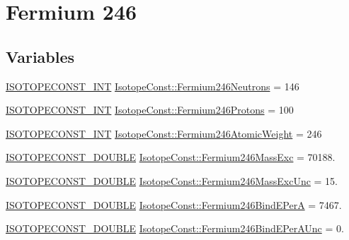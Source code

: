 \hypertarget{group___isotope_const-_fermium-_fm246}{}\section{Fermium 246}
\label{group___isotope_const-_fermium-_fm246}
\subsection*{Variables}
\begin{DoxyCompactItemize}
\item 
\mbox{\hyperlink{group___isotope_const-_macros_ga5f18360b3e99483a35c32d789e62621c}{I\+S\+O\+T\+O\+P\+E\+C\+O\+N\+S\+T\+\_\+\+I\+NT}} \mbox{\hyperlink{group___isotope_const-_fermium-_fm246_gab52c58f403af0334c850b33e5f3396a6}{Isotope\+Const\+::\+Fermium246\+Neutrons}} = 146
\item 
\mbox{\hyperlink{group___isotope_const-_macros_ga5f18360b3e99483a35c32d789e62621c}{I\+S\+O\+T\+O\+P\+E\+C\+O\+N\+S\+T\+\_\+\+I\+NT}} \mbox{\hyperlink{group___isotope_const-_fermium-_fm246_ga816e32ad23fcf279f650217ee8f920bb}{Isotope\+Const\+::\+Fermium246\+Protons}} = 100
\item 
\mbox{\hyperlink{group___isotope_const-_macros_ga5f18360b3e99483a35c32d789e62621c}{I\+S\+O\+T\+O\+P\+E\+C\+O\+N\+S\+T\+\_\+\+I\+NT}} \mbox{\hyperlink{group___isotope_const-_fermium-_fm246_ga1413e9da0cdba99f48173dc3727a7705}{Isotope\+Const\+::\+Fermium246\+Atomic\+Weight}} = 246
\item 
\mbox{\hyperlink{group___isotope_const-_macros_ga8f45a7272ce02c0b4c65c44636ed719a}{I\+S\+O\+T\+O\+P\+E\+C\+O\+N\+S\+T\+\_\+\+D\+O\+U\+B\+LE}} \mbox{\hyperlink{group___isotope_const-_fermium-_fm246_gaa5d056477860106f12aacad3d988c402}{Isotope\+Const\+::\+Fermium246\+Mass\+Exc}} = 70188.
\item 
\mbox{\hyperlink{group___isotope_const-_macros_ga8f45a7272ce02c0b4c65c44636ed719a}{I\+S\+O\+T\+O\+P\+E\+C\+O\+N\+S\+T\+\_\+\+D\+O\+U\+B\+LE}} \mbox{\hyperlink{group___isotope_const-_fermium-_fm246_ga9bc4e0f5dca55a0f1b1cc10fb8389759}{Isotope\+Const\+::\+Fermium246\+Mass\+Exc\+Unc}} = 15.
\item 
\mbox{\hyperlink{group___isotope_const-_macros_ga8f45a7272ce02c0b4c65c44636ed719a}{I\+S\+O\+T\+O\+P\+E\+C\+O\+N\+S\+T\+\_\+\+D\+O\+U\+B\+LE}} \mbox{\hyperlink{group___isotope_const-_fermium-_fm246_gaa6097c8b698c10487239653dcbab34ca}{Isotope\+Const\+::\+Fermium246\+Bind\+E\+PerA}} = 7467.
\item 
\mbox{\hyperlink{group___isotope_const-_macros_ga8f45a7272ce02c0b4c65c44636ed719a}{I\+S\+O\+T\+O\+P\+E\+C\+O\+N\+S\+T\+\_\+\+D\+O\+U\+B\+LE}} \mbox{\hyperlink{group___isotope_const-_fermium-_fm246_gac70e15e681da1ad915232902f318acb1}{Isotope\+Const\+::\+Fermium246\+Bind\+E\+Per\+A\+Unc}} = 0.

\end{DoxyCompactItemize}
